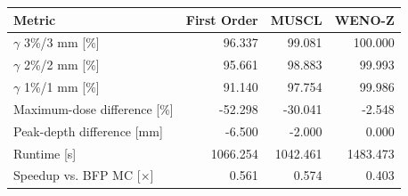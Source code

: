 \begin{tabular}{lrrr}
\toprule
Metric & First Order & MUSCL & WENO-Z \\
\midrule
$\gamma$ 3\%/3 mm [\%] & 96.337 & 99.081 & 100.000 \\
$\gamma$ 2\%/2 mm [\%] & 95.661 & 98.883 & 99.993 \\
$\gamma$ 1\%/1 mm [\%] & 91.140 & 97.754 & 99.986 \\
Maximum-dose difference [\%] & -52.298 & -30.041 & -2.548 \\
Peak-depth difference [mm] & -6.500 & -2.000 & 0.000 \\
Runtime [s] & 1066.254 & 1042.461 & 1483.473 \\
Speedup vs. BFP MC [$\times$] & 0.561 & 0.574 & 0.403 \\
\bottomrule
\end{tabular}
